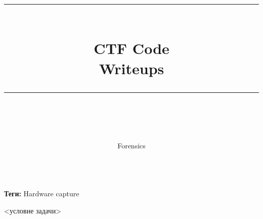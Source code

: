 \documentclass[idxtotoc,hyperref,openany,oneside]{files/forensics} %
\newcommand{\HRule}{\rule{\linewidth}{0.5mm}} %
\begin{document}

\frontmatter %
\title{
\begin{center}
\HRule \\[0.4cm]
{\Huge \bfseries CTF Code \\[0.5cm] \Large Writeups}\\[0.4cm] %
\HRule \\[1.5cm]
\end{center}
}
\author{\Huge Forensics \\ \\[2cm]} %
\maketitle

\tableofcontents

\mainmatter %












\textbf{Теги:} Hardware capture\vspace{\baselineskip}

\begin{tcolorbox}
<условие задачи>
\end{tcolorbox}
\end{document}
